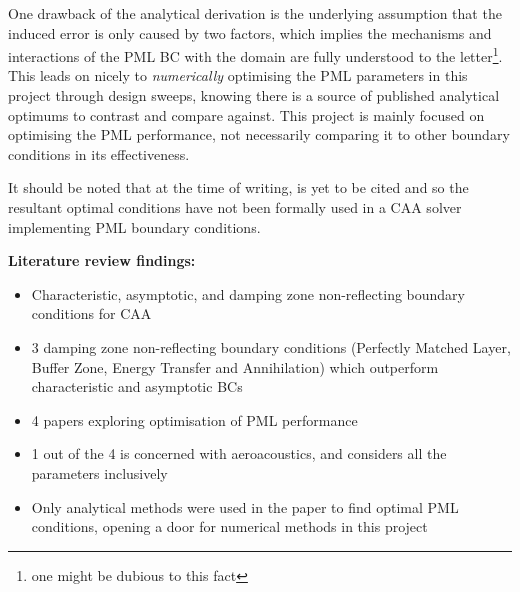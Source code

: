 One drawback of the analytical derivation \cite{choung2018nonreflective} is the underlying assumption that the induced error is only caused by two factors, which implies the mechanisms and interactions of the PML BC with the domain are fully understood to the letter\footnote[1]{one might be dubious to this fact}. This leads on nicely to \textit{numerically} optimising the PML parameters in this project through design sweeps, knowing there is a source of published analytical optimums to contrast and compare against. This project is mainly focused on optimising the PML performance, not necessarily comparing it to other boundary conditions in its effectiveness.

It should be noted that at the time of writing, \cite{choung2018nonreflective} is yet to be cited and so the resultant optimal conditions have not been formally used in a CAA solver implementing PML boundary conditions.


\textbf{Literature review findings:}
\begin{itemize}
    \itemsep0em
    \item Characteristic, asymptotic, and damping zone non-reflecting boundary conditions for CAA
    \item 3 damping zone non-reflecting boundary conditions (Perfectly Matched Layer, Buffer Zone, Energy Transfer and Annihilation) which outperform characteristic and asymptotic BCs
    \item 4 papers exploring optimisation of PML performance
    \item 1 out of the 4 is concerned with aeroacoustics, and considers all the parameters inclusively
    \item Only analytical methods were used in the paper to find optimal PML conditions, opening a door for numerical methods in this project
\end{itemize}
